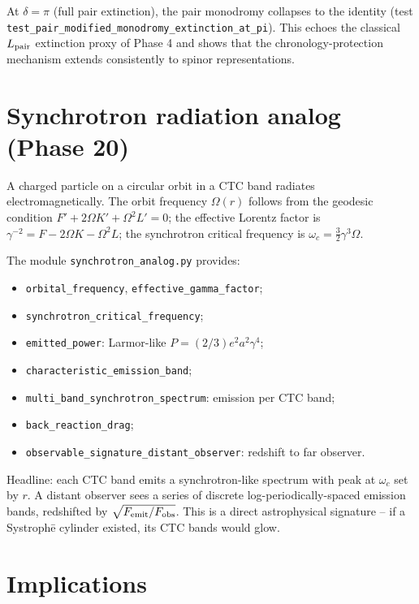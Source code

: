 \documentclass[11pt,a4paper]{article}
\begin{document}
At $\delta = \pi$ (full pair extinction), the pair monodromy
collapses to the identity (test
\texttt{test\_pair\_modified\_monodromy\_extinction\_at\_pi}). This
echoes the classical $L_{\rm pair}$ extinction proxy of Phase 4 and
shows that the chronology-protection mechanism extends consistently
to spinor representations.

\section{Synchrotron radiation analog (Phase 20)}

A charged particle on a circular orbit in a CTC band radiates
electromagnetically. The orbit frequency $\Omega(r)$ follows from
the geodesic condition $F' + 2\Omega K' + \Omega^2 L' = 0$; the
effective Lorentz factor is $\gamma^{-2} = F - 2\Omega K - \Omega^2 L$;
the synchrotron critical frequency is $\omega_c = \tfrac{3}{2}\gamma^3\Omega$.

The module \texttt{synchrotron\_analog.py} provides:
\begin{itemize}
\item \texttt{orbital\_frequency}, \texttt{effective\_gamma\_factor};
\item \texttt{synchrotron\_critical\_frequency};
\item \texttt{emitted\_power}: Larmor-like $P = (2/3)e^2 a^2 \gamma^4$;
\item \texttt{characteristic\_emission\_band};
\item \texttt{multi\_band\_synchrotron\_spectrum}: emission per CTC band;
\item \texttt{back\_reaction\_drag};
\item \texttt{observable\_signature\_distant\_observer}: redshift to far observer.
\end{itemize}

Headline: each CTC band emits a synchrotron-like spectrum with
peak at $\omega_c$ set by $r$. A distant observer sees a series of
discrete log-periodically-spaced emission bands, redshifted by
$\sqrt{F_{\rm emit}/F_{\rm obs}}$. This is a direct astrophysical
signature -- if a Systroph\=e cylinder existed, its CTC bands would
glow.

\section{Implications}
\end{document}
